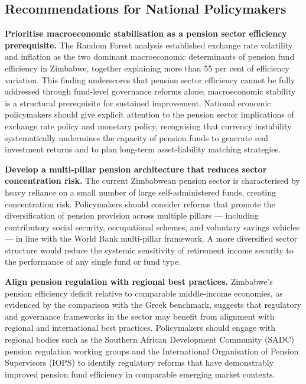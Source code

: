 \documentclass[12pt,a4paper]{article}
\begin{document}
\subsection{Recommendations for National Policymakers}

\textbf{Prioritise macroeconomic stabilisation as a pension sector efficiency prerequisite.} The Random Forest analysis established exchange rate volatility and inflation as the two dominant macroeconomic determinants of pension fund efficiency in Zimbabwe, together explaining more than 55 per cent of efficiency variation. This finding underscores that pension sector efficiency cannot be fully addressed through fund-level governance reforms alone; macroeconomic stability is a structural prerequisite for sustained improvement. National economic policymakers should give explicit attention to the pension sector implications of exchange rate policy and monetary policy, recognising that currency instability systematically undermines the capacity of pension funds to generate real investment returns and to plan long-term asset-liability matching strategies.

\textbf{Develop a multi-pillar pension architecture that reduces sector concentration risk.} The current Zimbabwean pension sector is characterised by heavy reliance on a small number of large self-administered funds, creating concentration risk. Policymakers should consider reforms that promote the diversification of pension provision across multiple pillars --- including contributory social security, occupational schemes, and voluntary savings vehicles --- in line with the World Bank multi-pillar framework. A more diversified sector structure would reduce the systemic sensitivity of retirement income security to the performance of any single fund or fund type.

\textbf{Align pension regulation with regional best practices.} Zimbabwe's pension efficiency deficit relative to comparable middle-income economies, as evidenced by the comparison with the Greek benchmark, suggests that regulatory and governance frameworks in the sector may benefit from alignment with regional and international best practices. Policymakers should engage with regional bodies such as the Southern African Development Community (SADC) pension regulation working groups and the International Organisation of Pension Supervisors (IOPS) to identify regulatory reforms that have demonstrably improved pension fund efficiency in comparable emerging market contexts.

\end{document}
